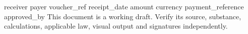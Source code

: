 \documentclass[11pt,a4paper]{article}
\begin{document}
{{receiver}}
{{payer}}
{{voucher_ref}}
{{receipt_date}}
{{amount}}
{{currency}}
{{payment_reference}}
{{approved_by}}
This document is a working draft. Verify its source, substance, calculations, applicable law, visual output and signatures independently.
\end{document}

